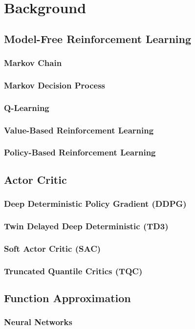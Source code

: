 \chapter{Background}

\section{Model-Free Reinforcement Learning}

\subsection{Markov Chain}

\subsection{Markov Decision Process}

\subsection{Q-Learning}

\subsection{Value-Based Reinforcement Learning}

\subsection{Policy-Based Reinforcement Learning}

\section{Actor Critic}
\subsection{Deep Deterministic Policy Gradient (DDPG)}
\subsection{Twin Delayed Deep Deterministic (TD3)}
\subsection{Soft Actor Critic (SAC)}
\subsection{Truncated Quantile Critics (TQC)}


\section{Function Approximation}

\subsection{Neural Networks}
